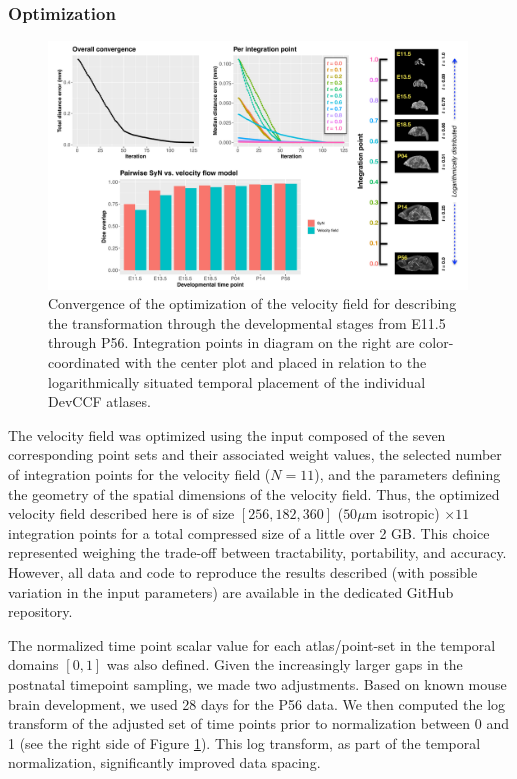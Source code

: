 \documentclass[
  12pt,
]{article}
\begin{document}
\subsubsection{Optimization}\label{optimization}

\begin{figure}[!htb]
\centering
\includegraphics[width=0.99\textwidth]{Figures/convergence.pdf}
\caption{Convergence of the optimization of the velocity field for describing
the transformation through the developmental stages from E11.5 through P56.
Integration points in diagram on the right are color-coordinated with the center
plot and placed in relation to the logarithmically situated temporal placement
of the individual DevCCF atlases.}
\label{fig:convergence}
\end{figure}

The velocity field was optimized using the input composed of the seven
corresponding point sets and their associated weight values, the
selected number of integration points for the velocity field (\(N=11\)),
and the parameters defining the geometry of the spatial dimensions of
the velocity field. Thus, the optimized velocity field described here is
of size \([256, 182, 360]\) (\(50
\mu\)m isotropic) \(\times 11\) integration points for a total
compressed size of a little over 2 GB. This choice represented weighing
the trade-off between tractability, portability, and accuracy. However,
all data and code to reproduce the results described (with possible
variation in the input parameters) are available in the dedicated GitHub
repository.

The normalized time point scalar value for each atlas/point-set in the
temporal domains \([0, 1]\) was also defined. Given the increasingly
larger gaps in the postnatal timepoint sampling, we made two
adjustments. Based on known mouse brain development, we used 28 days for
the P56 data. We then computed the log transform of the adjusted set of
time points prior to normalization between 0 and 1 (see the right side
of Figure \ref{fig:convergence}). This log transform, as part of the
temporal normalization, significantly improved data spacing.
\end{document}
